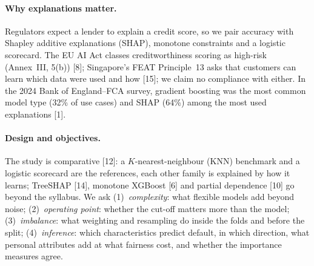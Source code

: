 \paragraph{Why explanations matter.}
Regulators expect a lender to explain a credit score, so we pair accuracy with Shapley additive explanations (SHAP), monotone constraints and a logistic scorecard. The EU AI Act classes creditworthiness scoring as high-risk (Annex~III, 5(b)) [8]; Singapore's FEAT Principle~13 asks that customers can learn which data were used and how [15]; we claim no compliance with either. In the 2024 Bank of England--FCA survey, gradient boosting was the most common model type (32\% of use cases) and SHAP (64\%) among the most used explanations [1].

\paragraph{Design and objectives.}
The study is comparative [12]: a $K$-nearest-neighbour (KNN) benchmark and a logistic scorecard are the references, each other family is explained by how it learns; TreeSHAP [14], monotone XGBoost [6] and partial dependence [10] go beyond the syllabus. We ask (1)~\emph{complexity}: what flexible models add beyond noise; (2)~\emph{operating point}: whether the cut-off matters more than the model; (3)~\emph{imbalance}: what weighting and resampling do inside the folds and before the split; (4)~\emph{inference}: which characteristics predict default, in which direction, what personal attributes add at what fairness cost, and whether the importance measures agree.
